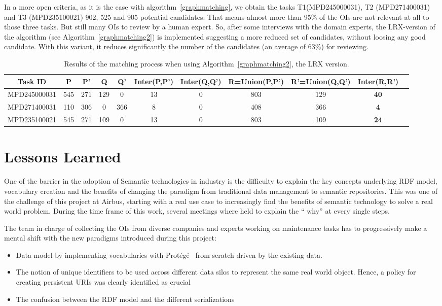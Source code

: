 \documentclass[a4paper,english,submission]{rnti}  %
\begin{document}
In a more open criteria, as it is the case with algorithm~\ref{graphmatching}, we obtain the tasks T1(MPD245000031), T2 (MPD271400031) and T3 (MPD235100021) 902, 525 and 905 potential candidates. That means almost more than 95\% of the OIs are not relevant at all to those three tasks. But still many OIs to review by a human expert. So, after some interviews with the domain experts, the LRX-version of the algorithm (see Algorithm~\ref{graphmatching2}) is implemented suggesting a more reduced set of candidates, without loosing any good candidate. With this variant, it reduces significantly the number of the candidates (an average of 63\%) for reviewing.    

\begin{table}[!htp]
\scriptsize
\centering

\begin{tabular}{|c|c|c|c|c|c|c|c|c|c|c|} 
\hline 
Task ID & P & P' & Q & Q' & Inter(P,P') & Inter(Q,Q') & R=Union(P,P') & R'=Union(Q,Q') & Inter(R,R') \\ 
\hline 
MPD245000031 & 545 & 271 & 129 & 0 & 13 & 0 & 803 & 129 & \textbf{40}\\ 
\hline 
MPD271400031 & 110 & 306 & 0 & 366 & 8 & 0 & 408 & 366 & \textbf{4} \\ 
\hline 
MPD235100021 & 545 & 271 & 109 & 0 & 13 & 0 & 803 & 109 & \textbf{24} \\  
\hline 
\end{tabular} 
\caption{Results of the matching process when using Algorithm~\ref{graphmatching2}, the LRX version.}
\label{tab:algo2}
\end{table}


\section{Lessons Learned}
\label{sec:lessons}
One of the barrier in the adoption of Semantic technologies in industry is the difficulty to explain the key concepts underlying RDF model, vocabulary creation and the benefits of changing the paradigm from traditional data management to semantic repositories. This was one of the challenge of this project at Airbus, starting with a real use case to increasingly find the benefits of semantic technology to solve a real world problem. During the time frame of this work, several meetings where held to explain the `` why'' at every single steps. 

The team in charge of collecting the OIs from diverse companies and experts working on maintenance tasks has to progressively make a mental shift with the new paradigms introduced during this project:
\begin{itemize}
\item Data model by implementing vocabularies with Prot\'eg\'e~\citep{noy2001} from scratch driven by the existing data.
\item The notion of unique identifiers to be used across different data silos to represent the same real world object. Hence, a policy for creating persistent URIs was clearly identified as crucial
\item The confusion between the RDF model and the different serializations 
\end{itemize}  
\end{document}
